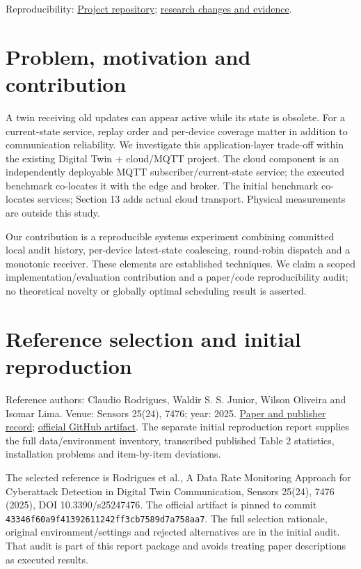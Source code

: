 \documentclass[11pt,a4paper]{article}
\begin{document}
Reproducibility: \href{https://github.com/SMR202/dt-mqtt-resilience}{Project repository}; \href{https://github.com/SMR202/dt-mqtt-resilience/pull/1}{research changes and evidence}.


\section{Problem, motivation and contribution}

A twin receiving old updates can appear active while its state is obsolete. For a current-state service, replay order and per-device coverage matter in addition to communication reliability. We investigate this application-layer trade-off within the existing Digital Twin + cloud/MQTT project. The cloud component is an independently deployable MQTT subscriber/current-state service; the executed benchmark co-locates it with the edge and broker. The initial benchmark co-locates services; Section 13 adds actual cloud transport. Physical measurements are outside this study.


Our contribution is a reproducible systems experiment combining committed local audit history, per-device latest-state coalescing, round-robin dispatch and a monotonic receiver. These elements are established techniques. We claim a scoped implementation/evaluation contribution and a paper/code reproducibility audit; no theoretical novelty or globally optimal scheduling result is asserted.


\section{Reference selection and initial reproduction}

Reference authors: Claudio Rodrigues, Waldir S. S. Junior, Wilson Oliveira and Isomar Lima. Venue: Sensors 25(24), 7476; year: 2025. \href{https://doi.org/10.3390/s25247476}{Paper and publisher record}; \href{https://github.com/woliveira1728/digital-twin}{official GitHub artifact}. The separate initial reproduction report supplies the full data/environment inventory, transcribed published Table 2 statistics, installation problems and item-by-item deviations.


The selected reference is Rodrigues et al., A Data Rate Monitoring Approach for Cyberattack Detection in Digital Twin Communication, Sensors 25(24), 7476 (2025), DOI 10.3390/s25247476. The official artifact is pinned to commit \texttt{43346f60a9f41392611242ff3cb7589d7a758aa7}. The full selection rationale, original environment/settings and rejected alternatives are in the initial audit. That audit is part of this report package and avoids treating paper descriptions as executed results.\cite{ref1}
\end{document}
